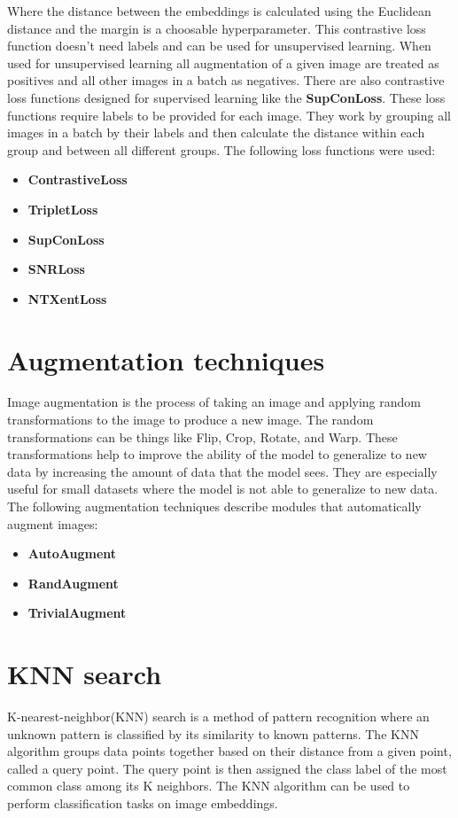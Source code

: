 \documentclass[12pt,a4paper]{report}
\begin{document}
Where the distance between the embeddings is calculated using the Euclidean distance and the margin is a choosable hyperparameter.
This contrastive loss function doesn't need labels and can be used for unsupervised learning.
When used for unsupervised learning all augmentation of a given image are treated as positives and all other images in a batch as negatives.
There are also contrastive loss functions designed for supervised learning like the \textbf{SupConLoss}\cite{SupConLoss}.
These loss functions require labels to be provided for each image.
They work by grouping all images in a batch by their labels and then calculate the distance within each group and between all different groups.
\newpage
The following loss functions were used:
\begin{itemize}
	\item \textbf{ContrastiveLoss} \cite{ContrastiveLoss}
 	\item \textbf{TripletLoss} \cite{TripletLoss}
  	\item \textbf{SupConLoss} \cite{SupConLoss}
    \item \textbf{SNRLoss} \cite{SNRLoss}
    \item \textbf{NTXentLoss} \cite{simclr}
\end{itemize}

\section{Augmentation techniques}
Image augmentation is the process of taking an image and applying random transformations to the image to produce a new image.
The random transformations can be things like Flip, Crop, Rotate, and Warp.
These transformations help to improve the ability of the model to generalize to new data by increasing the amount of data that the model sees.
They are especially useful for small datasets where the model is not able to generalize to new data.
The following augmentation techniques describe modules that automatically augment images:
\begin{itemize}
	\item \textbf{AutoAugment} \cite{AutoAugment}
 	\item \textbf{RandAugment} \cite{RandAugment}
  	\item \textbf{TrivialAugment} \cite{TrivialAugmentWide}
\end{itemize}

\newpage

\section{KNN search}
K-nearest-neighbor(KNN) search is a method of pattern recognition where an unknown pattern is classified by its similarity to known patterns.
The KNN algorithm groups data points together based on their distance from a given point, called a query point.
The query point is then assigned the class label of the most common class among its K neighbors.
The KNN algorithm can be used to perform classification tasks on image embeddings.
\end{document}
